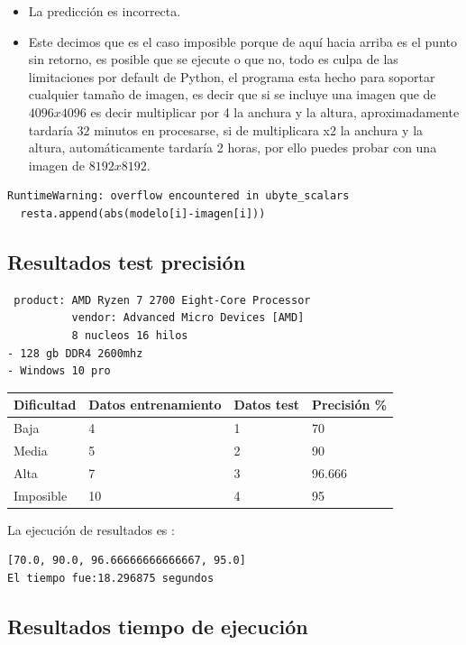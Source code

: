 \documentclass[
  spanish,
]{article}
\providecommand{\tightlist}{%
  \setlength{\itemsep}{0pt}\setlength{\parskip}{0pt}}
\begin{document}
\begin{itemize}
\tightlist
\item
  La predicción es incorrecta.
\item
  Este decimos que es el caso imposible porque de aquí hacia arriba es
  el punto sin retorno, es posible que se ejecute o que no, todo es
  culpa de las limitaciones por default de Python, el programa esta
  hecho para soportar cualquier tamaño de imagen, es decir que si se
  incluye una imagen que de \(4096x4096\) es decir multiplicar por 4 la
  anchura y la altura, aproximadamente tardaría \(32\) minutos en
  procesarse, si de multiplicara x2 la anchura y la altura,
  automáticamente tardaría 2 horas, por ello puedes probar con una
  imagen de \(8192x8192\).
\end{itemize}

\begin{verbatim}
RuntimeWarning: overflow encountered in ubyte_scalars
  resta.append(abs(modelo[i]-imagen[i]))
\end{verbatim}

\hypertarget{resultados-test-precisiuxf3n}{%
\subsection{Resultados test
precisión}\label{resultados-test-precisiuxf3n}}

\begin{verbatim}
 product: AMD Ryzen 7 2700 Eight-Core Processor
          vendor: Advanced Micro Devices [AMD]
          8 nucleos 16 hilos
- 128 gb DDR4 2600mhz
- Windows 10 pro
\end{verbatim}

\begin{longtable}[]{@{}llll@{}}
\toprule
Dificultad & Datos entrenamiento & Datos test & Precisión
\%\tabularnewline
\midrule
\endhead
Baja & 4 & 1 & 70\tabularnewline
Media & 5 & 2 & 90\tabularnewline
Alta & 7 & 3 & 96.666\tabularnewline
Imposible & 10 & 4 & 95\tabularnewline
\bottomrule
\end{longtable}

La ejecución de resultados es :

\begin{verbatim}
[70.0, 90.0, 96.66666666666667, 95.0]
El tiempo fue:18.296875 segundos
\end{verbatim}

\hypertarget{resultados-tiempo-de-ejecuciuxf3n}{%
\subsection{Resultados tiempo de
ejecución}\label{resultados-tiempo-de-ejecuciuxf3n}}
\end{document}
